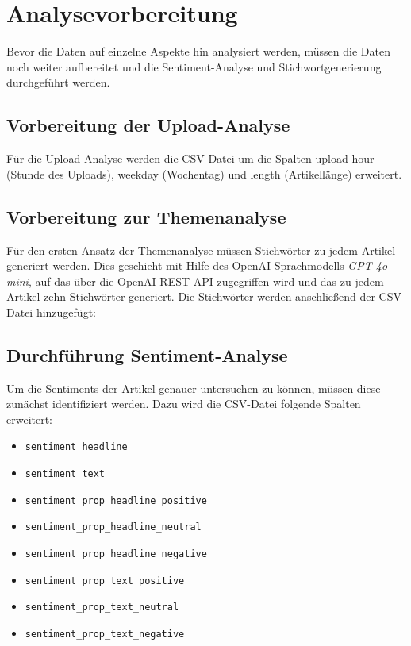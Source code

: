 \documentclass[12pt]{article}
\begin{document}
\begin{sloppypar}
	

	\section{Analysevorbereitung}

	Bevor die Daten auf einzelne Aspekte hin analysiert werden, müssen die Daten
	noch weiter aufbereitet und die Sentiment-Analyse und Stichwortgenerierung
	durchgeführt werden.

	\subsection{Vorbereitung der Upload-Analyse}

	Für die Upload-Analyse werden die CSV-Datei um die Spalten upload-hour
	(Stunde des Uploads), weekday (Wochentag) und length (Artikellänge)
	erweitert.

	

	\subsection{Vorbereitung zur Themenanalyse}

	Für den ersten Ansatz der Themenanalyse müssen Stichwörter zu jedem Artikel
	generiert werden. Dies geschieht mit Hilfe des OpenAI-Sprachmodells
	\emph{GPT-4o mini}, auf das über die OpenAI-REST-API zugegriffen wird und
	das zu jedem Artikel zehn Stichwörter generiert. Die Stichwörter werden
	anschließend der CSV-Datei hinzugefügt:

	

	\subsection{Durchführung Sentiment-Analyse}

	Um die Sentiments der Artikel genauer untersuchen zu können, müssen diese
	zunächst identifiziert werden. Dazu wird die CSV-Datei folgende Spalten
    erweitert:
    \begin{itemize}
        \item \texttt{sentiment\_headline}
	    \item \texttt{sentiment\_text}
        \item \texttt{sentiment\_prop\_headline\_positive}
	    \item \texttt{sentiment\_prop\_headline\_neutral}
        \item \texttt{sentiment\_prop\_headline\_negative}
	    \item \texttt{sentiment\_prop\_text\_positive}
        \item \texttt{sentiment\_prop\_text\_neutral}
	    \item \texttt{sentiment\_prop\_text\_negative}
    \end{itemize}


\end{sloppypar}
\end{document}
